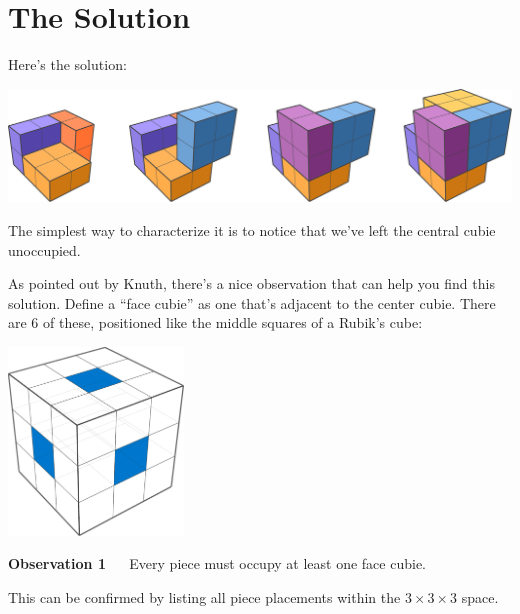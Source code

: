 \documentclass[
]{article}
\newenvironment{myboxed}{\begin{lrbox}{\mybox}\begin{minipage}{0.98\textwidth}}{\end{minipage}\end{lrbox}\fbox{\usebox{\mybox}}}
\newcommand{\boxedstart}{\begin{myboxed}}
\newcommand{\boxedend}{\end{myboxed}}
\begin{document}
\hypertarget{the-solution}{%
\section{The Solution}\label{the-solution}}

Here's the solution:

\medskip

\begin{center}\includegraphics[width=1\textwidth,height=\textheight]{img/solution_steps.pdf}\end{center}

\medskip

The simplest way to characterize it is to notice that we've left the
central cubie unoccupied.

As pointed out by Knuth, there's a nice observation that can help you
find this solution. Define a ``face cubie'' as one that's adjacent to
the center cubie. There are 6 of these, positioned like the middle
squares of a Rubik's cube:

\medskip

\begin{center}\includegraphics[width=0.35\textwidth,height=\textheight]{img/face_cubies.pdf}\end{center}

\medskip

\boxedstart

\textbf{Observation 1} \(\quad\) Every piece must occupy at least one
face cubie.

\boxedend 

This can be confirmed by listing all piece placements within the
\(3\times 3\times 3\) space.
\end{document}
